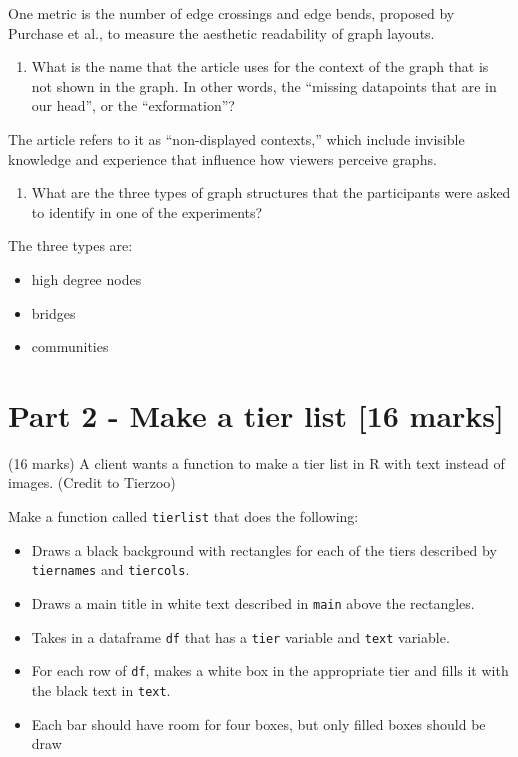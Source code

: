 \documentclass[
]{article}
\providecommand{\tightlist}{%
  \setlength{\itemsep}{0pt}\setlength{\parskip}{0pt}}
\begin{document}
One metric is the number of edge crossings and edge bends, proposed by
Purchase et al., to measure the aesthetic readability of graph layouts.

\begin{enumerate}
\def\labelenumi{\alph{enumi})}
\setcounter{enumi}{4}
\tightlist
\item
  What is the name that the article uses for the context of the graph
  that is not shown in the graph. In other words, the ``missing
  datapoints that are in our head'', or the ``exformation''?
\end{enumerate}

The article refers to it as ``non-displayed contexts,'' which include
invisible knowledge and experience that influence how viewers perceive
graphs.

\begin{enumerate}
\def\labelenumi{\alph{enumi})}
\setcounter{enumi}{5}
\tightlist
\item
  What are the three types of graph structures that the participants
  were asked to identify in one of the experiments?
\end{enumerate}

The three types are:

\begin{itemize}
\item
  high degree nodes
\item
  bridges
\item
  communities
\end{itemize}

\newpage

\section{Part 2 - Make a tier list {[}16
marks{]}}\label{part-2---make-a-tier-list-16-marks}

(16 marks) A client wants a function to make a tier list in R with text
instead of images. (Credit to Tierzoo)

Make a function called \texttt{tierlist} that does the following:

\begin{itemize}
\tightlist
\item
  Draws a black background with rectangles for each of the tiers
  described by \texttt{tiernames} and \texttt{tiercols}.
\item
  Draws a main title in white text described in \texttt{main} above the
  rectangles.
\item
  Takes in a dataframe \texttt{df} that has a \texttt{tier} variable and
  \texttt{text} variable.
\item
  For each row of \texttt{df}, makes a white box in the appropriate tier
  and fills it with the black text in \texttt{text}.
\item
  Each bar should have room for four boxes, but only filled boxes should
  be draw
\end{itemize}
\end{document}
